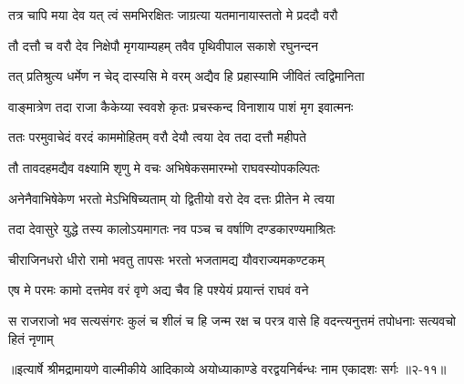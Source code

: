 \twolineshloka
{तत्र चापि मया देव यत् त्वं समभिरक्षितः}
{जाग्रत्या यतमानायास्ततो मे प्रददौ वरौ} %

\twolineshloka
{तौ दत्तौ च वरौ देव निक्षेपौ मृगयाम्यहम्}
{तवैव पृथिवीपाल सकाशे रघुनन्दन} %

\twolineshloka
{तत् प्रतिश्रुत्य धर्मेण न चेद् दास्यसि मे वरम्}
{अद्यैव हि प्रहास्यामि जीवितं त्वद्विमानिता} %

\twolineshloka
{वाङ्मात्रेण तदा राजा कैकेय्या स्ववशे कृतः}
{प्रचस्कन्द विनाशाय पाशं मृग इवात्मनः} %

\twolineshloka
{ततः परमुवाचेदं वरदं काममोहितम्}
{वरौ देयौ त्वया देव तदा दत्तौ महीपते} %

\twolineshloka
{तौ तावदहमद्यैव वक्ष्यामि शृणु मे वचः}
{अभिषेकसमारम्भो राघवस्योपकल्पितः} %

\twolineshloka
{अनेनैवाभिषेकेण भरतो मेऽभिषिच्यताम्}
{यो द्वितीयो वरो देव दत्तः प्रीतेन मे त्वया} %

\twolineshloka
{तदा देवासुरे युद्धे तस्य कालोऽयमागतः}
{नव पञ्च च वर्षाणि दण्डकारण्यमाश्रितः} %

\twolineshloka
{चीराजिनधरो धीरो रामो भवतु तापसः}
{भरतो भजतामद्य यौवराज्यमकण्टकम्} %

\twolineshloka
{एष मे परमः कामो दत्तमेव वरं वृणे}
{अद्य चैव हि पश्येयं प्रयान्तं राघवं वने} %

\twolineshloka
{स राजराजो भव सत्यसंगरः कुलं च शीलं च हि जन्म रक्ष च}
{परत्र वासे हि वदन्त्यनुत्तमं तपोधनाः सत्यवचो हितं नृणाम्} %


॥इत्यार्षे श्रीमद्रामायणे वाल्मीकीये आदिकाव्ये अयोध्याकाण्डे वरद्वयनिर्बन्धः नाम एकादशः सर्गः ॥२-११॥
